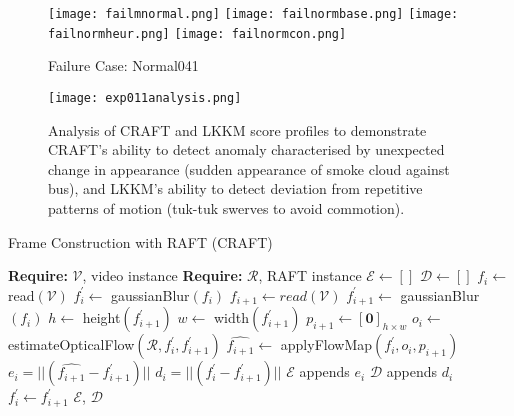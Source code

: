 \documentclass[sigplan,authorversion,nonacm, 9pt]{acmart}
\begin{document}
\begin{figure*}[h]
    \centering
    \begin{minipage}[b]{\textwidth}
        \centering
        \texttt{[image: failmnormal.png]}
        \texttt{[image: failnormbase.png]}
        \texttt{[image: failnormheur.png]}
        \texttt{[image: failnormcon.png]}
        \caption{Failure Case: Normal041}
        \label{fig:failnormal041}
    \end{minipage}
\end{figure*}

\begin{figure*}[h!]
    \centering
    \texttt{[image: exp011analysis.png]}
    \caption{Analysis of CRAFT and LKKM score profiles to demonstrate CRAFT's ability to detect anomaly characterised by unexpected change in appearance (sudden appearance of smoke cloud against bus), and LKKM's ability to detect deviation from repetitive patterns of motion (tuk-tuk swerves to avoid commotion).}
    \label{fig:exp011analysis}
\end{figure*}
\newpage
\FloatBarrier
\begin{algorithm*} \label{fig:psCRAFT}
	\caption{Frame Construction with RAFT (CRAFT)} 
	\begin{algorithmic}[1]
	\State \textbf{Require:} $\mathcal{V}$, video instance  
	\State \textbf{Require:} $\mathcal{R}$, RAFT instance 
	\State $\mathcal{E} \leftarrow []$
	\State $\mathcal{D} \leftarrow []$
	\State $f_{i} \leftarrow$ read$(\mathcal{V})$
	\State $f_{i}^{\prime} \leftarrow$ gaussianBlur$(f_{i})$
	\State $f_{i+1} \leftarrow read(\mathcal{V})$
	\State $f_{i+1}^{\prime} \leftarrow$ gaussianBlur$(f_{i})$
	\State $h \leftarrow$ height$(f_{i+1}^{\prime})$
	\State $w \leftarrow$ width$(f_{i+1}^{\prime})$
	\State $p_{i+1} \leftarrow \mathbf{[0]}_{h \times w} $
	\State $o_{i} \leftarrow$ estimateOpticalFlow$(\mathcal{R}, f_{i}^{\prime}, f_{i+1}^{\prime})$
	\State $\hat{f_{i+1}} \leftarrow$ applyFlowMap$(f_{i}^{\prime}, o_{i}, p_{i+1})$
	\State $e_{i} = \vert\vert (\hat{f_{i+1}} - f_{i+1}^{\prime}) \vert\vert$
	\State $d_{i} = \vert\vert ({f_{i}^{\prime}} - f_{i+1}^{\prime}) \vert\vert$
    \State $\mathcal{E}$ appends $e_{i}$
    \State $\mathcal{D}$ appends $d_{i}$
    \State $f_{i}^{\prime} \leftarrow f_{i+1}^{\prime}$
	\EndWhile
	\State \Return $\mathcal{E}$, $\mathcal{D}$
	\end{algorithmic} 
\end{algorithm*}
\end{document}
